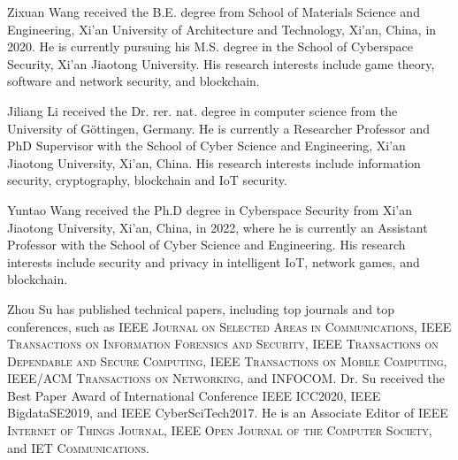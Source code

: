 \documentclass[lettersize,journal]{IEEEtran}
\begin{document}
\IEEEaftertitletext{\vspace{-2.5in}}
\begin{IEEEbiography}{Zixuan Wang}
received the B.E. degree from School of Materials Science and Engineering, Xi'an University of Architecture and Technology, Xi'an, China, in 2020. He is currently pursuing his M.S. degree in the School of Cyberspace Security, Xi'an Jiaotong University. His research interests include game theory, software and network security, and blockchain.\end{IEEEbiography}
\IEEEaftertitletext{\vspace{-2.5in}}
\begin{IEEEbiography}{Jiliang Li}
received the Dr. rer. nat. degree in computer science from the University of  G\"{o}ttingen, Germany. He is currently a Researcher Professor and PhD Supervisor with the School of Cyber Science and Engineering, Xi'an Jiaotong University, Xi'an, China. His research interests include information security, cryptography, blockchain and IoT security.
\end{IEEEbiography}
\IEEEaftertitletext{\vspace{-2.5in}}
\begin{IEEEbiography}{Yuntao Wang}
received the Ph.D degree in Cyberspace Security from Xi'an Jiaotong University, Xi'an, China, in 2022, where he is currently an Assistant Professor with the School of Cyber Science and Engineering. His research interests include security and privacy in intelligent IoT, network games, and blockchain.
\end{IEEEbiography}
\IEEEaftertitletext{\vspace{-2.5in}}
\begin{IEEEbiography}{Zhou Su}
has published technical papers, including top journals and top conferences, such as {\scshape IEEE Journal on Selected Areas in Communications}, {\scshape IEEE Transactions on Information Forensics and Security}, {\scshape IEEE Transactions on Dependable and Secure Computing}, {\scshape IEEE Transactions on Mobile Computing}, {\scshape IEEE/ACM Transactions on Networking}, and {\scshape INFOCOM}. 
Dr. Su received the Best Paper Award of International Conference IEEE ICC2020, IEEE BigdataSE2019, and IEEE CyberSciTech2017. He is an Associate Editor of {\scshape IEEE Internet of Things Journal}, {\scshape IEEE Open Journal of the Computer Society}, and {\scshape IET Communications}.
\end{IEEEbiography}
\end{document}
